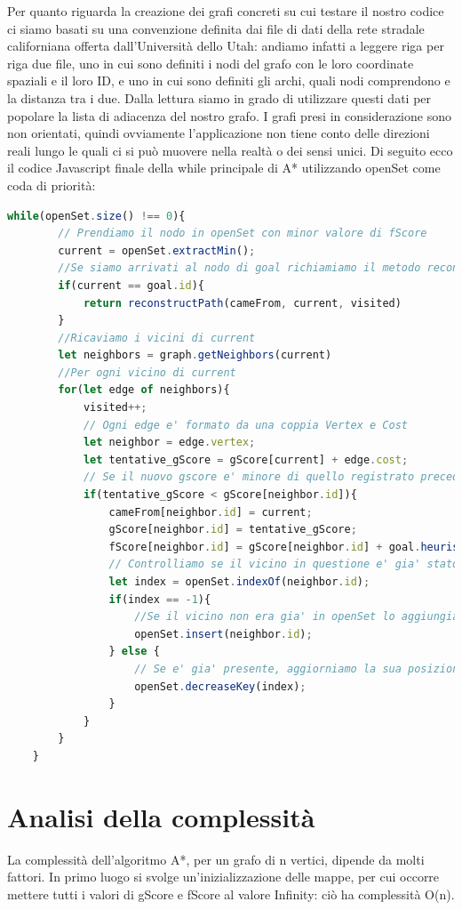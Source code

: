 \documentclass[12pt,a4paper]{report}
\begin{document}
Per quanto riguarda la creazione dei grafi concreti su cui testare il nostro codice ci siamo basati su una convenzione definita dai file di dati della rete stradale californiana offerta dall'Università dello Utah: andiamo infatti a leggere riga per riga due file, uno in cui sono definiti i nodi del grafo con le loro coordinate spaziali e il loro ID, e uno in cui sono definiti gli archi, quali nodi comprendono e la distanza tra i due. Dalla lettura siamo in grado di utilizzare questi dati per popolare la lista di adiacenza del nostro grafo. I grafi presi in considerazione sono non orientati, quindi ovviamente l'applicazione non tiene conto delle direzioni reali lungo le quali ci si può muovere nella realtà o dei sensi unici.
\newpage
Di seguito ecco il codice Javascript finale della while principale di A* utilizzando openSet come coda di priorità:
\\
\begin{lstlisting}[language=JavaScript]
	while(openSet.size() !== 0){
		// Prendiamo il nodo in openSet con minor valore di fScore
		current = openSet.extractMin();
		//Se siamo arrivati al nodo di goal richiamiamo il metodo reconstructPath
		if(current == goal.id){
			return reconstructPath(cameFrom, current, visited)
		} 
		//Ricaviamo i vicini di current
		let neighbors = graph.getNeighbors(current)
		//Per ogni vicino di current 
		for(let edge of neighbors){
			visited++;
			// Ogni edge e' formato da una coppia Vertex e Cost
			let neighbor = edge.vertex;
			let tentative_gScore = gScore[current] + edge.cost;
			// Se il nuovo gscore e' minore di quello registrato precedentemente, aggiorniamo i valori relativi
			if(tentative_gScore < gScore[neighbor.id]){
				cameFrom[neighbor.id] = current;
				gScore[neighbor.id] = tentative_gScore;
				fScore[neighbor.id] = gScore[neighbor.id] + goal.heuristic(neighbor);
				// Controlliamo se il vicino in questione e' gia' stato inserito in openSet
				let index = openSet.indexOf(neighbor.id);
				if(index == -1){
					//Se il vicino non era gia' in openSet lo aggiungiamo
					openSet.insert(neighbor.id);
				} else {
					// Se e' gia' presente, aggiorniamo la sua posizione nella coda
					openSet.decreaseKey(index);
				}
			}
		}
	}
\end{lstlisting}

\chapter{Analisi della complessità}

La complessità dell'algoritmo A*, per un grafo di n vertici, dipende da molti fattori.
In primo luogo si svolge un'inizializzazione delle mappe, per cui occorre mettere tutti i valori di gScore e fScore al valore Infinity: ciò ha complessità O(n).
\end{document}
